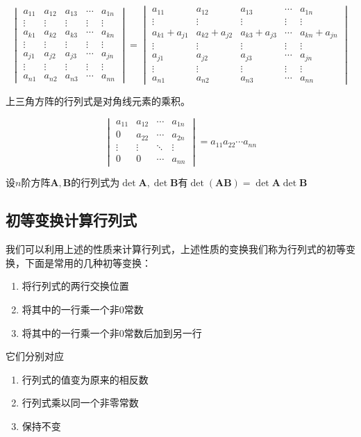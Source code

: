 $$\begin{vmatrix}
	a_{11} & a_{12} & a_{13} & \cdots & a_{1n}\\
	\vdots & \vdots & \vdots & \vdots & \vdots\\
	a_{k1} & a_{k2} & a_{k3} & \cdots & a_{kn}\\
	\vdots & \vdots & \vdots & \vdots & \vdots\\
	a_{j1} & a_{j2} & a_{j3} & \cdots & a_{jn}\\
	\vdots & \vdots & \vdots & \vdots & \vdots\\
	a_{n1} & a_{n2} & a_{n3} & \cdots & a_{nn}
\end{vmatrix}=\begin{vmatrix}
	a_{11} & a_{12} & a_{13} & \cdots & a_{1n}\\
	\vdots & \vdots & \vdots & \vdots & \vdots\\
	a_{k1}+a_{j1} & a_{k2}+a_{j2} & a_{k3}+a_{j3} & \cdots & a_{kn}+a_{jn}\\
	\vdots & \vdots & \vdots & \vdots & \vdots\\
	a_{j1} & a_{j2} & a_{j3} & \cdots & a_{jn}\\
	\vdots & \vdots & \vdots & \vdots & \vdots\\
	a_{n1} & a_{n2} & a_{n3} & \cdots & a_{nn}
\end{vmatrix}$$

\begin{corollary}
	上三角方阵的行列式是对角线元素的乘积。
\end{corollary}

$$\begin{vmatrix}  
	a_{11}& a_{12}& \cdots  & a_{1n} \\  
	0 & a_{22}& \cdots  & a_{2n} \\  
	\vdots & \vdots & \ddots & \vdots \\  
	0& 0& \cdots  & a_{nn}  
\end{vmatrix}=a_{11}a_{22}\cdots a_{nn}$$

\begin{corollary}
	设$n$阶方阵$\mathbf{A},\mathbf{B}$的行列式为$\det \mathbf{A},\det \mathbf{B}$有$\det (\mathbf{A}\mathbf{B})=\det \mathbf{A} \det \mathbf{B}$
\end{corollary}

\subsection{初等变换计算行列式}

我们可以利用上述的性质来计算行列式，上述性质的变换我们称为行列式的初等变换，下面是常用的几种初等变换：
\begin{enumerate}
	\item 将行列式的两行交换位置
	\item 将其中的一行乘一个非0常数
	\item 将其中的一行乘一个非0常数后加到另一行
\end{enumerate}
它们分别对应
\begin{enumerate}
	\item 行列式的值变为原来的相反数
	\item 行列式乘以同一个非零常数
	\item 保持不变
\end{enumerate}

